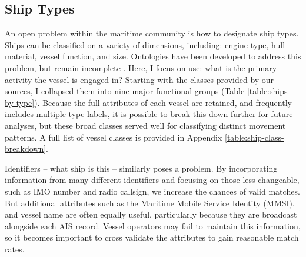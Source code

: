 

\subsection{Ship Types}


An open problem within the maritime community is how to designate ship types. Ships can be classified on a variety of dimensions, including: engine type, hull material, vessel function, and size. Ontologies have been developed to address this problem, but remain incomplete \citep{Vries2009}. Here, I focus on use: what is the primary activity the vessel is engaged in? Starting with the classes provided by our sources, I collapsed them into nine major functional groups (Table \ref{table:ships-by-type}). Because the full attributes of each vessel are retained, and frequently includes multiple type labels, it is possible to break this down further for future analyses, but these broad classes served well for classifying distinct movement patterns. A full list of vessel classes is provided in Appendix \ref{table:ship-class-breakdown}.

Identifiers -- what ship is this -- similarly poses a problem. By incorporating information from many different identifiers and focusing on those less changeable, such as IMO number and radio callsign, we increase the chances of valid matches. But additional attributes such as the Maritime Mobile Service Identity (MMSI), and vessel name are often equally useful, particularly because they are broadcast alongside each AIS record. Vessel operators may fail to maintain this information, so it becomes important to cross validate the attributes to gain reasonable match rates.


